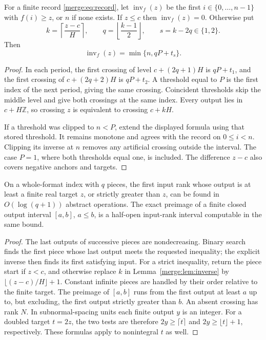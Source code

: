 \begin{lemma}\label{merge:lem:inverse}
For a finite record \eqref{merge:eq:record}, let $\operatorname{inv}_f(z)$ be the first
$i\in\{0,\ldots,n-1\}$ with $f(i)\geq z$, or $n$ if none exists.
If $z\leq c$ then $\operatorname{inv}_f(z)=0$. Otherwise put
\[
 k=\left\lceil\frac{z-c}{H}\right\rceil,\qquad
 q=\left\lfloor\frac{k-1}{2}\right\rfloor,\qquad s=k-2q\in\{1,2\}.
\]
Then
\begin{equation}\label{merge:eq:inverse}
 \operatorname{inv}_f(z)=\min\{n,qP+t_s\}.
\end{equation}
\end{lemma}

\begin{proof}
In each period, the first crossing of level $c+(2q+1)H$ is $qP+t_1$,
and the first crossing of $c+(2q+2)H$ is $qP+t_2$. A threshold equal
to $P$ is the first index of the next period, giving the same crossing.
Coincident thresholds skip the middle level and give both crossings
at the same index. Every output lies in $c+H\mathbb Z$, so crossing $z$ is
equivalent to crossing $c+kH$.

If a threshold was clipped to $n<P$, extend the displayed formula using
that stored threshold. It remains monotone and agrees with the record
on $0\leq i<n$. Clipping its inverse at $n$ removes any artificial
crossing outside the interval. The case $P=1$, where both thresholds
equal one, is included. The difference $z-c$ also covers negative
anchors and targets.
\end{proof}

\begin{corollary}\label{merge:cor:inverse-query}
On a whole-format index with $q$ pieces, the first input rank whose
output is at least a finite real target $z$, or strictly greater than $z$,
can be found in $O(\log(q+1))$ abstract operations. The exact preimage
of a finite closed output interval $[a,b]$, $a\leq b$, is a half-open
input-rank interval computable in the same bound.
\end{corollary}

\begin{proof}
The last outputs of successive pieces are nondecreasing. Binary search
finds the first piece whose last output meets the requested inequality;
the explicit inverse then finds its first satisfying input. For a strict
inequality, return the piece start if $z<c$, and otherwise replace $k$
in Lemma~\ref{merge:lem:inverse} by $\lfloor(z-c)/H\rfloor+1$.
Constant infinite pieces are handled by their order relative to the
finite target. The preimage of $[a,b]$ runs from the first output at
least $a$ up to, but excluding, the first output strictly greater than
$b$. An absent crossing has rank $N$. In subnormal-spacing units each
finite output $y$ is an integer. For a doubled target $t=2z$, the two
tests are therefore $2y\geq\lceil t\rceil$ and
$2y\geq\lfloor t\rfloor+1$, respectively. These formulas apply to
nonintegral $t$ as well.
\end{proof}

